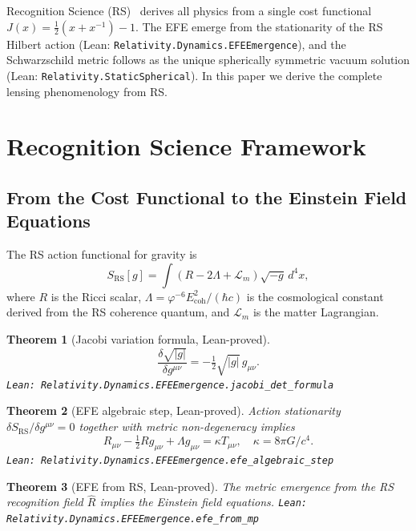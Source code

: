 \documentclass[12pt,a4paper]{article}
\newtheorem{theorem}{Theorem}[section]
\theoremstyle{definition}
\theoremstyle{remark}
\begin{document}
Recognition Science (RS)~\cite{Washburn2026a} derives all physics from
a single cost functional $J(x) = \tfrac{1}{2}(x + x^{-1}) - 1$.  The
EFE emerge from the stationarity of the RS Hilbert action
(Lean: \texttt{Relativity.Dynamics.EFEEmergence}), and the Schwarzschild
metric follows as the unique spherically symmetric vacuum solution
(Lean: \texttt{Relativity.StaticSpherical}).  In this paper we derive the
complete lensing phenomenology from RS.

\section{Recognition Science Framework}
\label{sec:rs}

\subsection{From the Cost Functional to the Einstein Field Equations}

The RS action functional for gravity is
\begin{equation}
  S_\mathrm{RS}[g] = \int \left(R - 2\Lambda + \mathcal{L}_m\right)
  \sqrt{-g}\,d^4x,
  \label{eq:action}
\end{equation}
where $R$ is the Ricci scalar, $\Lambda = \varphi^{-6} E_\mathrm{coh}^2
/(\hbar c)$ is the cosmological constant derived from the RS coherence
quantum, and $\mathcal{L}_m$ is the matter Lagrangian.

\begin{theorem}[Jacobi variation formula, Lean-proved]\label{thm:jacobi}
\[
  \frac{\delta\sqrt{|g|}}{\delta g^{\mu\nu}} = -\tfrac{1}{2}\sqrt{|g|}\,g_{\mu\nu}.
\]
\texttt{Lean: Relativity.Dynamics.EFEEmergence.jacobi\_det\_formula}
\end{theorem}

\begin{theorem}[EFE algebraic step, Lean-proved]\label{thm:efe_alg}
Action stationarity $\delta S_\mathrm{RS}/\delta g^{\mu\nu} = 0$
together with metric non-degeneracy implies
\[
  R_{\mu\nu} - \tfrac{1}{2}R g_{\mu\nu} + \Lambda g_{\mu\nu} = \kappa T_{\mu\nu},
  \quad \kappa = 8\pi G/c^4.
\]
\texttt{Lean: Relativity.Dynamics.EFEEmergence.efe\_algebraic\_step}
\end{theorem}

\begin{theorem}[EFE from RS, Lean-proved]\label{thm:efe}
The metric emergence from the RS recognition field $\hat{R}$ implies
the Einstein field equations.
\texttt{Lean: Relativity.Dynamics.EFEEmergence.efe\_from\_mp}
\end{theorem}
\end{document}
